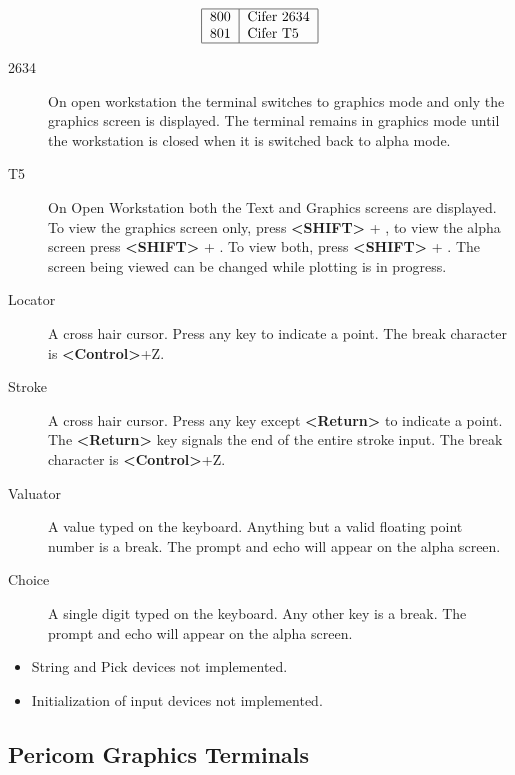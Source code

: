 \documentclass[11pt]{article}
\newcommand{\key}[1]{\fbox{#1}}
\renewcommand{\key}[1]{{\bf<#1>}}
\begin{document}

\[\begin{tabular}{|l|l|}\hline
800 &Cifer 2634\\
801 &Cifer T5\\\hline
\end{tabular}\]


\begin{description}
\item[2634]
On open workstation the terminal switches to graphics mode and only the
graphics screen is displayed.
The terminal remains in graphics mode until the workstation is closed when it is
switched back to alpha mode.
\item[T5]
On Open Workstation both the Text and Graphics screens are displayed.
To view the graphics screen only, press \key{SHIFT} + \key{F19}, to view 
the alpha screen press \key{SHIFT} + \key{F18}.
To view both, press \key{SHIFT} + \key{F20}.
The screen being viewed can be changed while plotting is in progress.
\end{description}


\begin{description}
\item[Locator] A cross hair cursor.         
Press any key to indicate a point.
The break character is \key{Control}+Z.
\item[Stroke] A cross hair cursor.
Press any key except \key{Return} to indicate a point.
The \key{Return} key signals the end of the entire stroke input.
The break character is \key{Control}+Z.
\item[Valuator] A value typed on the keyboard.
Anything but a valid floating point number is a break.
The prompt and echo will appear on the alpha screen.
\item[Choice] A single digit typed on the keyboard.
Any other key is a break.
The prompt and echo will appear on the alpha screen.
\end{description}


\begin{itemize}
\item String and Pick devices not implemented.
\item Initialization of input devices not implemented.
\end{itemize}

\subsection{Pericom Graphics Terminals}
\label{pergt}
\end{document}
